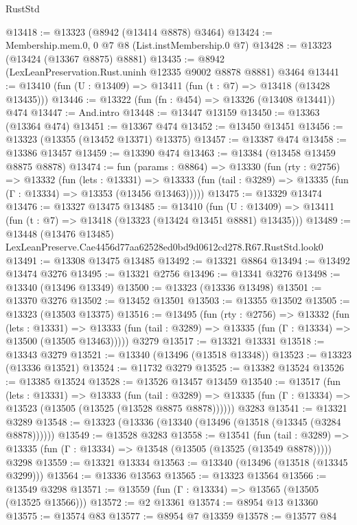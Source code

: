 \begin{lexlean}{RustStd}
\begin{coremodule}
@13418 := @13323 (@8942 (@13414 @8878) @3464)
@13424 := Membership.mem.{0, 0} @7 @8 (List.instMembership.{0} @7)
@13428 := @13323 (@13424 (@13367 @8875) @8881)
@13435 := @8942 (LexLeanPreservation.Rust.uninh @12335 @9002 @8878 @8881) @3464
@13441 := @13410 (fun (U : @13409) => @13411 (fun (t : @7) => @13418 (@13428 @13435)))
@13446 := @13322 (fun (fn : @454) => @13326 (@13408 @13441)) @474
@13447 := And.intro
@13448 := @13447 @13159
@13450 := @13363 (@13364 @474)
@13451 := @13367 @474
@13452 := @13450 @13451
@13456 := @13323 (@13355 (@13452 @13371) @13375)
@13457 := @13387 @474
@13458 := @13386 @13457
@13459 := @13390 @474
@13463 := @13384 (@13458 @13459 @8875 @8878)
@13474 := fun (params : @8864) =>
  @13330
    (fun (rty : @2756) =>
    @13332
      (fun (lets : @13331) =>
      @13333 (fun (tail : @3289) => @13335 (fun (Γ : @13334) => @13353 (@13456 @13463)))))
@13475 := @13329 @13474
@13476 := @13327 @13475
@13485 := @13410
    (fun (U : @13409) => @13411 (fun (t : @7) => @13418 (@13323 (@13424 @13451 @8881) @13435)))
@13489 := @13448 (@13476 @13485) LexLeanPreserve.Cae4456d77aa62528ed0bd9d0612cd278.R67.RustStd.look0
@13491 := @13308 @13475 @13485
@13492 := @13321 @8864
@13494 := @13492 @13474 @3276
@13495 := @13321 @2756
@13496 := @13341 @3276
@13498 := @13340 (@13496 @13349)
@13500 := @13323 (@13336 @13498)
@13501 := @13370 @3276
@13502 := @13452 @13501
@13503 := @13355 @13502
@13505 := @13323 (@13503 @13375)
@13516 := @13495
    (fun (rty : @2756) =>
    @13332
      (fun (lets : @13331) =>
      @13333 (fun (tail : @3289) => @13335 (fun (Γ : @13334) => @13500 (@13505 @13463)))))
    @3279
@13517 := @13321 @13331
@13518 := @13343 @3279
@13521 := @13340 (@13496 (@13518 @13348))
@13523 := @13323 (@13336 @13521)
@13524 := @11732 @3279
@13525 := @13382 @13524
@13526 := @13385 @13524
@13528 := @13526 @13457 @13459
@13540 := @13517
    (fun (lets : @13331) =>
    @13333
      (fun (tail : @3289) =>
      @13335 (fun (Γ : @13334) => @13523 (@13505 (@13525 (@13528 @8875 @8878))))))
    @3283
@13541 := @13321 @3289
@13548 := @13323 (@13336 (@13340 (@13496 (@13518 (@13345 (@3284 @8878))))))
@13549 := @13528 @3283
@13558 := @13541
    (fun (tail : @3289) => @13335 (fun (Γ : @13334) => @13548 (@13505 (@13525 (@13549 @8878)))))
    @3298
@13559 := @13321 @13334
@13563 := @13340 (@13496 (@13518 (@13345 @3299)))
@13564 := @13336 @13563
@13565 := @13323 @13564
@13566 := @13549 @3298
@13571 := @13559 (fun (Γ : @13334) => @13565 (@13505 (@13525 @13566)))
@13572 := @2 @13361
@13574 := @8954 @13 @13360
@13575 := @13574 @83
@13577 := @8954 @7 @13359
@13578 := @13577 @84

\end{coremodule}
\end{lexlean}
